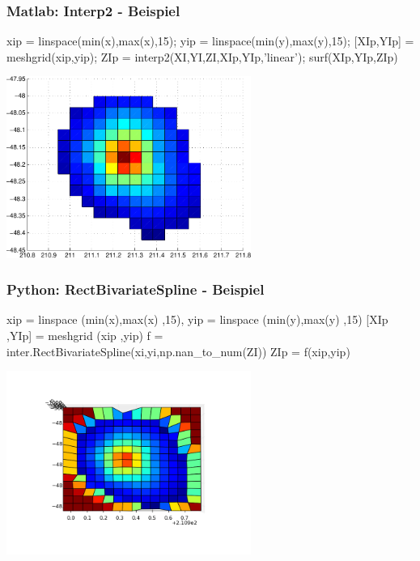 \documentclass[hyperref={xetex}]{beamer}
\begin{document}
%
% 
\begin{frame}[fragile]\frametitle{Matlab: Interp2 - Beispiel}
\begin{matlabin}
xip = linspace(min(x),max(x),15); yip = linspace(min(y),max(y),15);
[XIp,YIp] = meshgrid(xip,yip);
ZIp = interp2(XI,YI,ZI,XIp,YIp,'linear');
surf(XIp,YIp,ZIp)
\end{matlabin}
\begin{center}
\includegraphics[width=0.6\textwidth]{figures/beispiel_interp2_plot}
\end{center}
\end{frame}

%
\begin{frame}[fragile]\frametitle{Python: RectBivariateSpline - Beispiel}
\begin{pyin}
xip = linspace (min(x),max(x) ,15), yip = linspace (min(y),max(y) ,15)
[XIp ,YIp] = meshgrid (xip ,yip)
f = inter.RectBivariateSpline(xi,yi,np.nan_to_num(ZI))
ZIp = f(xip,yip)
\end{pyin}
\begin{center}
\includegraphics[width=0.6\textwidth]{figures/beispiel_interp2_pyplot}
\end{center}
\end{frame}
\end{document}
